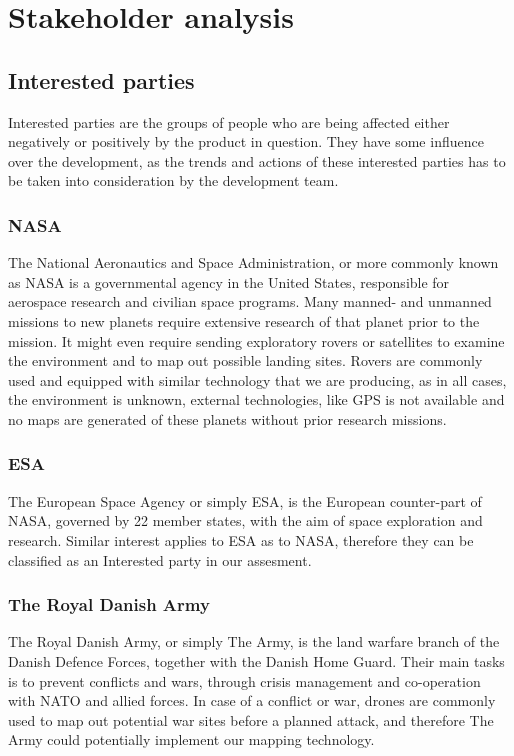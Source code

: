 \section{Stakeholder analysis}
	
\subsection{Interested parties}
Interested parties are the groups of people who are being affected either negatively or positively by the product in question. They have some influence over the development, as the trends and actions of these interested parties has to be taken into consideration by the development team.

\subsubsection{NASA}
The National Aeronautics and Space Administration, or more commonly known as NASA is a governmental agency in the United States, responsible for aerospace research and civilian space programs. Many manned- and unmanned missions to new planets require extensive research of that planet prior to the mission. It might even require sending exploratory rovers or satellites to examine the environment and to map out possible landing sites. Rovers are commonly used and equipped with similar technology that we are producing, as in all cases, the environment is unknown, external technologies, like GPS is not available and no maps are generated of these planets without prior research missions. 

\subsubsection{ESA}
The European Space Agency or simply ESA, is the European counter-part of NASA, governed by 22 member states, with the aim of space exploration and research. Similar interest applies to ESA as to NASA, therefore they can be classified as an Interested party in our assesment.

\subsubsection{The Royal Danish Army}
The Royal Danish Army, or simply The Army, is the land warfare branch of the Danish Defence Forces, together with the Danish Home Guard. Their main tasks is to prevent conflicts and wars, through crisis management and co-operation with NATO and allied forces\cite{armytasks}. In case of a conflict or war, drones are commonly used to map out potential war sites before a planned attack, and therefore The Army could potentially implement our mapping technology.

